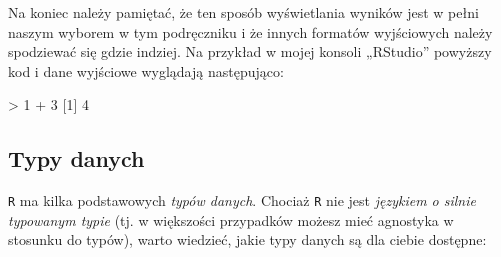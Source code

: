 \documentclass[
]{article}
\newenvironment{Shaded}{\begin{snugshade}}{\end{snugshade}}
\newcommand{\DecValTok}[1]{\textcolor[rgb]{0.00,0.00,0.81}{#1}}
\newcommand{\NormalTok}[1]{#1}
\newcommand{\SpecialCharTok}[1]{\textcolor[rgb]{0.00,0.00,0.00}{#1}}
\begin{document}
Na koniec należy pamiętać, że ten sposób wyświetlania wyników jest w
pełni naszym wyborem w tym podręczniku i że innych formatów wyjściowych
należy spodziewać się gdzie indziej. Na przykład w mojej konsoli
„RStudio'' powyższy kod i dane wyjściowe wyglądają następująco:

\begin{Shaded}
\begin{Highlighting}[]
\SpecialCharTok{\textgreater{}} \DecValTok{1} \SpecialCharTok{+} \DecValTok{3}
\NormalTok{[}\DecValTok{1}\NormalTok{] }\DecValTok{4}
\end{Highlighting}
\end{Shaded}

\hypertarget{data-types}{%
\subsection{Typy danych}\label{data-types}}

\texttt{R} ma kilka podstawowych \emph{typów danych}. Chociaż \texttt{R}
nie jest \emph{językiem o silnie typowanym typie} (tj. w większości
przypadków możesz mieć agnostyka w stosunku do typów), warto wiedzieć,
jakie typy danych są dla ciebie dostępne:
\end{document}
